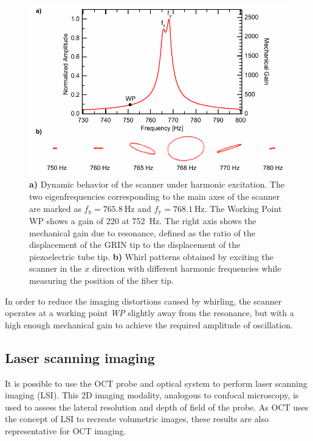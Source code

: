 \documentclass[10pt]{iopart}
\begin{document}
\begin{figure}[h!]\centering \includegraphics[width=\columnwidth]{figures/bodeWhirl.pdf}
      \caption{\textbf{a)} Dynamic behavior of the scanner under harmonic excitation. The two eigenfrequencies corresponding to the main axes of the scanner are marked as $f_\mathrm{x} = \SI{765.8}{\hertz}$ and $f_\mathrm{y} = \SI{768.1}{\hertz}$.
      The Working Point WP shows a gain of 220 at \SI{752}{\hertz}. 
      The right axis shows the mechanical gain due to resonance, defined as the ratio of the displacement of the GRIN tip to the displacement of the piezoelectric tube tip.
      \textbf{b)} Whirl patterns obtained by exciting the scanner in the $x$ direction with different harmonic frequencies while measuring the position of the fiber tip. }
      \label{fig:bode}
\end{figure}

In order to reduce the imaging distortions caused by whirling, the scanner operates at a working point \textit{WP} slightly away from the resonance, but with a high enough mechanical gain to achieve the required amplitude of oscillation.


\subsection{Laser scanning imaging}


It is possible to use the OCT probe and optical system to perform laser scanning imaging (LSI). This 2D imaging modality, analogous to confocal microscopy, is used to assess the lateral resolution and depth of field of the probe. As OCT uses the concept of LSI to recreate volumetric images, these results are also representative for OCT imaging.
\end{document}
